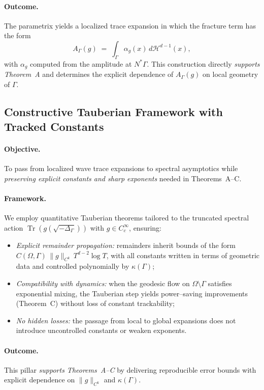 \paragraph{Outcome.}
The parametrix yields a localized trace expansion in which the fracture term has
the form
\[
  A_\Gamma(g) \;=\; \int_\Gamma \alpha_g(x)\,d\mathcal{H}^{d-1}(x),
\]
with \(\alpha_g\) computed from the amplitude at \(N^\ast\Gamma\).
This construction directly \emph{supports Theorem~A} and determines the explicit
dependence of \(A_\Gamma(g)\) on local geometry of \(\Gamma\).

\subsection{Constructive Tauberian Framework with Tracked Constants}

\paragraph{Objective.}
To pass from localized wave trace expansions to spectral asymptotics while
\emph{preserving explicit constants and sharp exponents} needed in Theorems~A–C.

\paragraph{Framework.}
We employ quantitative Tauberian theorems tailored to the truncated spectral
action \(\operatorname{Tr}(g(\sqrt{-\Delta_\Gamma}))\) with \(g\in C_c^\infty\),
ensuring:
\begin{itemize}
  \item \emph{Explicit remainder propagation:} remainders inherit bounds of the
  form \(C(\Omega,\Gamma)\,\|g\|_{C^k}\,T^{d-2}\log T\), with all constants
  written in terms of geometric data and controlled polynomially by
  \(\kappa(\Gamma)\);
  \item \emph{Compatibility with dynamics:} when the geodesic flow on
  \(\Omega\setminus\Gamma\) satisfies exponential mixing, the Tauberian step
  yields power–saving improvements (Theorem~C) without loss of constant
  trackability;
  \item \emph{No hidden losses:} the passage from local to global expansions does
  not introduce uncontrolled constants or weaken exponents.
\end{itemize}

\paragraph{Outcome.}
This pillar \emph{supports Theorems~A–C} by delivering reproducible error bounds
with explicit dependence on \(\|g\|_{C^k}\) and \(\kappa(\Gamma)\).

